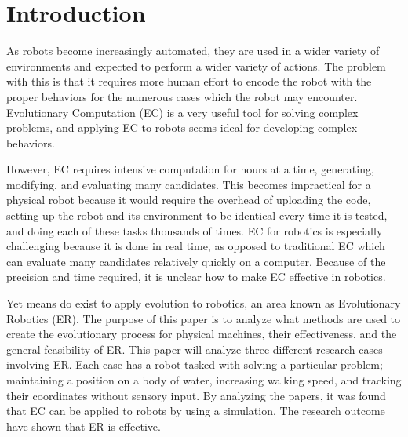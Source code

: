 \documentclass{sig-alternate}
\begin{document}


	
\section{Introduction}
 As robots become increasingly automated, they are used in a wider variety of environments and expected to perform a wider variety of actions. The problem with this is that it requires more human effort to encode the robot with the proper behaviors for the numerous cases which the robot may encounter. Evolutionary Computation (EC) is a very useful tool for solving complex problems, and applying EC to robots seems ideal for developing complex behaviors. 
 
 However, EC requires intensive computation for hours at a time, generating, modifying, and evaluating many candidates. This becomes impractical for a physical robot because it would require the overhead of uploading the code, setting up the robot and its environment to be identical every time it is tested, and doing each of these tasks thousands of times. EC for robotics is especially challenging because it is done in real time, as opposed to traditional EC which can evaluate many candidates relatively quickly on a computer. Because of the precision and time required, it is unclear how to make EC effective in robotics.
 
 Yet means do exist to apply evolution to robotics, an area known as Evolutionary Robotics (ER). The purpose of this paper is to analyze what methods are used to create the evolutionary process for physical machines, their effectiveness, and the general feasibility of ER. This paper will analyze three different research cases involving ER. Each case has a robot tasked with solving a particular problem; maintaining a position on a body of water, increasing walking speed, and tracking their coordinates without sensory input. By analyzing the papers, it was found that EC can be applied to robots by using a simulation. The research outcome have shown that ER is effective.
\end{document}
